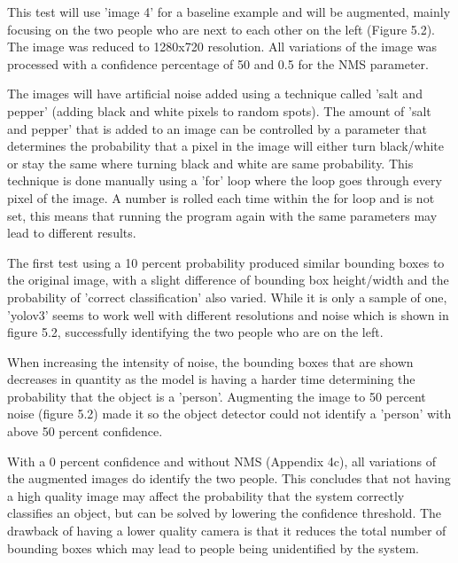 \documentclass[12pt]{report}
\begin{document}
\vspace{2mm}

This test will use 'image 4' for a baseline example and will be augmented, mainly focusing on the two people who are next to each other on the left (Figure 5.2). The image was reduced to 1280x720 resolution. All variations of the image was processed with a confidence percentage of 50 and 0.5 for the NMS parameter. 

\vspace{2mm}

The images will have artificial noise added using a technique called 'salt and pepper' (adding black and white pixels to random spots). The amount of 'salt and pepper' that is added to an image can be controlled by a parameter that determines the probability that a pixel in the image will either turn black/white or stay the same where turning black and white are same probability. This technique is done manually using a 'for' loop where the loop goes through every pixel of the image. A number is rolled each time within the for loop and is not set, this means that running the program again with the same parameters may lead to different results.

\vspace{2mm}

The first test using a 10 percent probability produced similar bounding boxes to the original image, with a slight difference of bounding box height/width and the probability of 'correct classification' also varied. While it is only a sample of one, 'yolov3' seems to work well with different resolutions and noise which is shown in figure 5.2, successfully identifying the two people who are on the left.

\vspace{2mm}

When increasing the intensity of noise, the bounding boxes that are shown decreases in quantity as the model is having a harder time determining the probability that the object is a 'person'. Augmenting the image to 50 percent noise (figure 5.2) made it so the object detector could not identify a 'person' with above 50 percent confidence. 

\vspace{2mm}

With a 0 percent confidence and without NMS (Appendix 4c), all variations of the augmented images do identify the two people. This concludes that not having a high quality image may affect the probability that the system correctly classifies an object, but can be solved by lowering the confidence threshold. The drawback of having a lower quality camera is that it reduces the total number of bounding boxes which may lead to people being unidentified by the system.
\end{document}
